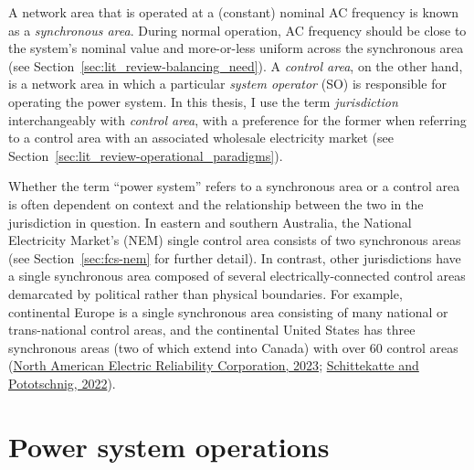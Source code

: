 \documentclass[12pt,a4paper,]{report}
\begin{document}
A network area that is operated at a (constant) nominal AC frequency is
known as a \emph{synchronous area}. During normal operation, AC
frequency should be close to the system's nominal value and more-or-less
uniform across the synchronous area (see
Section~\ref{sec:lit_review-balancing_need}). A \emph{control area}, on
the other hand, is a network area in which a particular \emph{system
operator} (SO) is responsible for operating the power system. In this
thesis, I use the term \emph{jurisdiction} interchangeably with
\emph{control area}, with a preference for the former when referring to
a control area with an associated wholesale electricity market (see
Section~\ref{sec:lit_review-operational_paradigms}).

Whether the term ``power system'' refers to a synchronous area or a
control area is often dependent on context and the relationship between
the two in the jurisdiction in question. In eastern and southern
Australia, the National Electricity Market's (NEM) single control area
consists of two synchronous areas (see Section~\ref{sec:fcs-nem} for
further detail). In contrast, other jurisdictions have a single
synchronous area composed of several electrically-connected control
areas demarcated by political rather than physical boundaries. For
example, continental Europe is a single synchronous area consisting of
many national or trans-national control areas, and the continental
United States has three synchronous areas (two of which extend into
Canada) with over 60 control areas
(\protect\hyperlink{ref-northamericanelectricreliabilitycorporationNERCInterconnections2023}{North
American Electric Reliability Corporation, 2023};
\protect\hyperlink{ref-schittekatteDistributedEnergyResources2022}{Schittekatte
and Pototschnig, 2022}).

\hypertarget{sec:lit_review-operations}{%
\section{Power system operations}\label{sec:lit_review-operations}}
\end{document}
